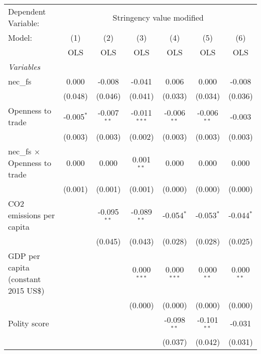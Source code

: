 
\begingroup
\centering
\begin{tabular}{lcccccc}
   \toprule
   Dependent Variable: & \multicolumn{6}{c}{Stringency value modified}\\
   Model:                               & (1)          & (2)           & (3)            & (4)           & (5)           & (6)\\  
                                        &  OLS         & OLS           & OLS            & OLS           & OLS           & OLS\\  
   \midrule
   \emph{Variables}\\
   nec\_fs                              & 0.000        & -0.008        & -0.041         & 0.006         & 0.000         & -0.008\\   
                                        & (0.048)      & (0.046)       & (0.041)        & (0.033)       & (0.034)       & (0.036)\\   
   Openness to trade                    & -0.005$^{*}$ & -0.007$^{**}$ & -0.011$^{***}$ & -0.006$^{**}$ & -0.006$^{**}$ & -0.003\\   
                                        & (0.003)      & (0.003)       & (0.002)        & (0.003)       & (0.003)       & (0.003)\\   
   nec\_fs $\times$ Openness to trade   & 0.000        & 0.000         & 0.001$^{**}$   & 0.000         & 0.000         & 0.000\\   
                                        & (0.001)      & (0.001)       & (0.001)        & (0.000)       & (0.000)       & (0.000)\\   
   CO2 emissions per capita             &              & -0.095$^{**}$ & -0.089$^{**}$  & -0.054$^{*}$  & -0.053$^{*}$  & -0.044$^{*}$\\   
                                        &              & (0.045)       & (0.043)        & (0.028)       & (0.028)       & (0.025)\\   
   GDP per capita (constant 2015 US\$)  &              &               & 0.000$^{***}$  & 0.000$^{***}$ & 0.000$^{**}$  & 0.000$^{**}$\\   
                                        &              &               & (0.000)        & (0.000)       & (0.000)       & (0.000)\\   
   Polity score                         &              &               &                & -0.098$^{**}$ & -0.101$^{**}$ & -0.031\\   
                                        &              &               &                & (0.037)       & (0.042)       & (0.031)\\   

\end{tabular}
